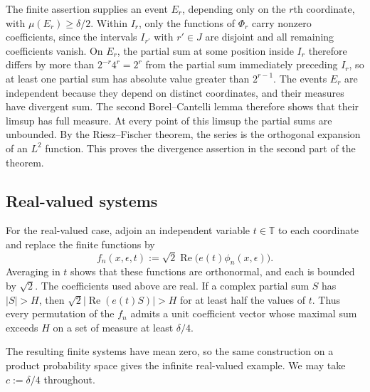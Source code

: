 \documentclass[11pt]{article}
\theoremstyle{remark}
\numberwithin{equation}{section}
\newcommand{\T}{\mathbb T}
\begin{document}
The finite assertion supplies an event $E_r$, depending only on the $r$th coordinate, with $\mu(E_r)\geq\delta/2$. Within $I_r$, only the functions of $\Phi_r$ carry nonzero coefficients, since the intervals $I_{r'}$ with $r'\in J$ are disjoint and all remaining coefficients vanish. On $E_r$, the partial sum at some position inside $I_r$ therefore differs by more than $2^{-r}4^r=2^r$ from the partial sum immediately preceding $I_r$, so at least one partial sum has absolute value greater than $2^{r-1}$. The events $E_r$ are independent because they depend on distinct coordinates, and their measures have divergent sum. The second Borel--Cantelli lemma therefore shows that their limsup has full measure. At every point of this limsup the partial sums are unbounded. By the Riesz--Fischer theorem, the series is the orthogonal expansion of an $L^2$ function. This proves the divergence assertion in the second part of the theorem.

\subsection*{Real-valued systems}

For the real-valued case, adjoin an independent variable $t\in\T$ to each coordinate and replace the finite functions by
\[
 f_n(x,\epsilon,t):=\sqrt2\operatorname{Re}\bigl(e(t)\phi_n(x,\epsilon)\bigr).
\]
Averaging in $t$ shows that these functions are orthonormal, and each is bounded by $\sqrt2$. The coefficients used above are real. If a complex partial sum $S$ has $|S|>H$, then $\sqrt2|\operatorname{Re}(e(t)S)|>H$ for at least half the values of $t$. Thus every permutation of the $f_n$ admits a unit coefficient vector whose maximal sum exceeds $H$ on a set of measure at least $\delta/4$.

The resulting finite systems have mean zero, so the same construction on a product probability space gives the infinite real-valued example. We may take $c:=\delta/4$ throughout.
\end{document}
